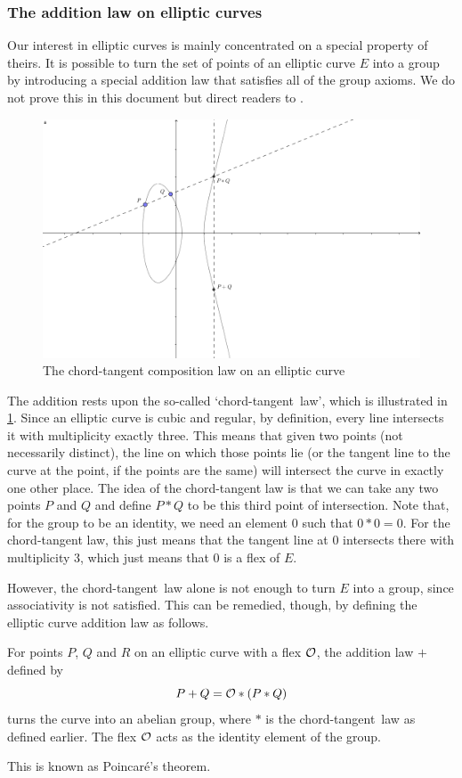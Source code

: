 \subsubsection{The addition law on elliptic curves}
Our interest in elliptic curves is mainly concentrated on a special property of theirs.
It is possible to turn the set of points of an elliptic curve $E$ into a group by introducing a special addition law that satisfies all of the group axioms.
We do not prove this in this document but direct readers to \cite{silverman2009}.
\begin{figure}[htbp]
	\centering
	\includegraphics[scale=0.3]{../Figures/ellipticaddition.png}
	\caption{The chord-tangent composition law on an elliptic curve}
	\label{ellipticaddition}
\end{figure}
The addition rests upon the so-called `chord-tangent~law', which is illustrated in \cref{ellipticaddition}.
Since an elliptic curve is cubic and regular, by definition, every line intersects it with multiplicity exactly three.
This means that given two points (not necessarily distinct), the line on which those points lie (or the tangent line to the curve at the point, if the points are the same) will intersect the curve in exactly one other place.
The idea of the chord-tangent law is that we can take any two points $P$ and $Q$ and define $P * Q$ to be this third point of intersection.
Note that, for the group to be an identity, we need an element $0$ such that $0 * 0 = 0$.
For the chord-tangent law, this just means that the tangent line at $0$ intersects there with multiplicity 3, which just means that $0$ is a flex of $E$.

However, the chord-tangent~law alone is not enough to turn $E$ into a group, since associativity is not satisfied.
This can be remedied, though, by defining the elliptic curve addition law as follows.
\begin{theorem}
	For points $P$, $Q$ and $R$ on an elliptic curve with a flex $\mathcal{O}$, the addition law $+$ defined by
	$$P + Q = \mathcal{O} * (P * Q)$$
	turns the curve into an abelian group, where $*$ is the chord-tangent~law as defined earlier.
	The flex $\mathcal{O}$ acts as the identity element of the group.
\end{theorem}
This is known as Poincaré's theorem.
